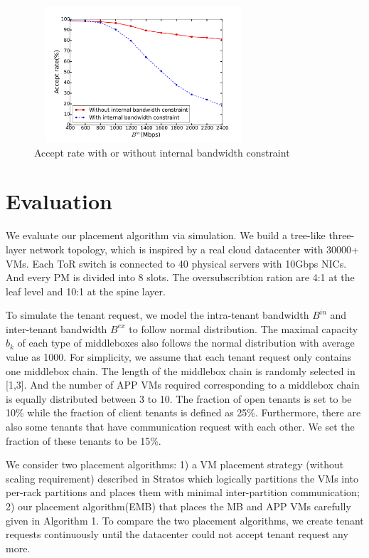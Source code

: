 \documentclass[review]{elsarticle}
\begin{document}
\begin{figure}
	\centering
	\includegraphics[width=3.2in,height=2.0in]{fig/pm_constraint.pdf}
	\caption{Accept rate with or without internal bandwidth constraint}
	\label{fig:pm_constraint}
\end{figure}

\section{Evaluation}\label{sec:simulation}
We evaluate our placement algorithm via simulation. We build a tree-like three-layer network topology, which is inspired by a real cloud datacenter with 30000+ VMs. Each ToR switch is connected to 40 physical servers with 10Gbps NICs. And every PM is divided into 8 slots. The oversubscribtion ration are 4:1 at the leaf level and 10:1 at the spine layer.  

To simulate the tenant request, we model the intra-tenant bandwidth $B^{in}$ and inter-tenant bandwidth $B^{ex}$ to follow normal distribution. The maximal capacity $b_k$ of each type of middleboxes also follows the normal distribution with average value as 1000. For simplicity, we assume that each tenant request only contains one middlebox chain. The length of the middlebox chain is randomly selected in [1,3]. And the number of APP VMs required corresponding to a middlebox chain is equally distributed between 3 to 10. The fraction of open tenants is set to be 10\% while the fraction of client tenants is defined as 25\%. Furthermore, there are also some tenants that have communication request with each other. We set the fraction of these tenants to be 15\%.  

We consider two placement algorithms: 1) a VM placement strategy (without scaling requirement) described in Stratos \cite{stratos12} which logically partitions the VMs into per-rack partitions and places them with minimal inter-partition communication; 2) our placement algorithm(EMB) that places the MB and APP VMs carefully given in Algorithm 1. To compare the two placement algorithms, we create tenant requests continuously until the datacenter could not accept tenant request any more.
\end{document}
